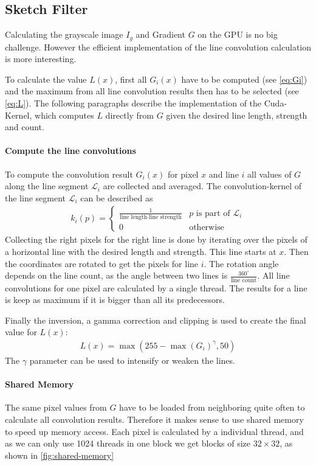 \subsection{Sketch Filter}
Calculating the grayscale image $I_g$ and Gradient $G$ on the GPU is no big
challenge. However the efficient implementation of the line convolution
calculation is more interesting.

To calculate the value $L(x)$, first all $G_i(x)$ have to
be computed (see \autoref{eq:Gi}) and the maximum from all line convolution
results then has to be selected (see \autoref{eq:L}). The following paragraphs describe the
implementation of the Cuda-Kernel, which computes $L$ directly from $G$ given
the desired line length, strength and count.

\paragraph{Compute the line convolutions} 
To compute the convolution result $G_i(x)$ for pixel $x$ and line $i$ all values of $G$
along the line segment $\mathscr{L}_i$ are collected and averaged. The
convolution-kernel of the line segment $\mathscr{L}_i$ can be described as 
\begin{align*}
  k_i(p) = \begin{cases}
    \frac{1}{\text{line length} \cdot \text{line strength}} & p \text{ is part
    of } \mathscr{L}_i\\
    0 & \text{otherwise}
  \end{cases}
\end{align*}
Collecting the right pixels for the right line is done by iterating over the
pixels of a horizontal line with the desired length and strength. This line
starts at $x$. Then the coordinates are rotated to get the pixels for line $i$.
The rotation angle depends on the line count, as the angle between two lines is
$\frac{360^{\circ}}{\text{line count}}$.  All line convolutions for one pixel
are calculated by a single thread. The results for a line is keep as maximum if
it is bigger than all its predecessors. 

Finally the inversion, a gamma correction and clipping is used to create the
final value for $L(x)$:
\begin{align*}
  L(x) = \max(255 - \max(G_i)^{\gamma}, 50)
\end{align*}
The $\gamma$ parameter can be used to intensify or weaken the lines.

\paragraph{Shared Memory}
The same pixel values from $G$ have to be loaded from neighboring quite often to
calculate all convolution results.  Therefore it makes sense to use shared memory
to speed up memory access.  Each pixel is calculated by a individual thread,
and as we can only use 1024 threads in one block we get blocks of size
$32\times32$, as shown in \autoref{fig:shared-memory}

